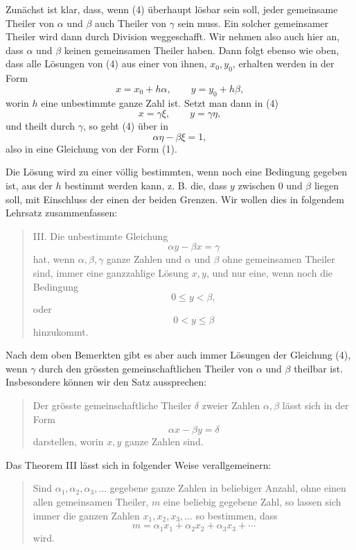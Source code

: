 \documentclass[11pt]{article}
\begin{document}
Zunächst ist klar, dass, wenn (4) überhaupt lösbar sein soll, jeder gemeinsame Theiler von $\alpha$ und $\beta$ auch Theiler von $\gamma$ sein muss. Ein solcher gemeinsamer Theiler wird dann durch Division weggeschafft. Wir nehmen also auch hier an, dass $\alpha$ und $\beta$ keinen gemeinsamen Theiler haben. Dann folgt ebenso wie oben, dass alle Lösungen von (4) aus einer von ihnen, $x_0,y_0$, erhalten werden in der Form
\[
        x=x_0+h\alpha,
        \qquad
        y=y_0+h\beta,
\]
worin $h$ eine unbestimmte ganze Zahl ist. Setzt man dann in (4)
\[
        x=\gamma\xi,
        \qquad
        y=\gamma\eta,
\]
und theilt durch $\gamma$, so geht (4) über in
\[
        \alpha\eta-\beta\xi=1,
\]
also in eine Gleichung von der Form (1).

Die Lösung wird zu einer völlig bestimmten, wenn noch eine Bedingung gegeben ist, aus der $h$ bestimmt werden kann, z. B. die, dass $y$ zwischen $0$ und $\beta$ liegen soll, mit Einschluss der einen der beiden Grenzen. Wir wollen dies in folgendem Lehrsatz zusammenfassen:

\begin{quote}
III. Die unbestimmte Gleichung
\[
        \alpha y-\beta x=\gamma
\]
hat, wenn $\alpha,\beta,\gamma$ ganze Zahlen und $\alpha$ und $\beta$ ohne gemeinsamen Theiler sind, immer eine ganzzahlige Lösung $x,y$, und nur eine, wenn noch die Bedingung
\[
        0\le y<\beta,
\]
oder
\[
        0<y\le \beta
\]
hinzukommt.
\end{quote}

Nach dem oben Bemerkten gibt es aber auch immer Lösungen der Gleichung (4), wenn $\gamma$ durch den grössten gemeinschaftlichen Theiler von $\alpha$ und $\beta$ theilbar ist. Insbesondere können wir den Satz aussprechen:
\begin{quote}
Der grösste gemeinschaftliche Theiler $\delta$ zweier Zahlen $\alpha,\beta$ lässt sich in der Form
\[
        \alpha x-\beta y=\delta
\]
darstellen, worin $x,y$ ganze Zahlen sind.
\end{quote}

Das Theorem III lässt sich in folgender Weise verallgemeinern:
\begin{quote}
Sind $\alpha_1,\alpha_2,\alpha_3,\ldots$ gegebene ganze Zahlen in beliebiger Anzahl, ohne einen allen gemeinsamen Theiler, $m$ eine beliebig gegebene Zahl, so lassen sich immer die ganzen Zahlen $x_1,x_2,x_3,\ldots$ so bestimmen, dass
\[
\tag{5}        m=\alpha_1x_1+\alpha_2x_2+\alpha_3x_3+\cdots
\]
wird.
\end{quote}
\end{document}
